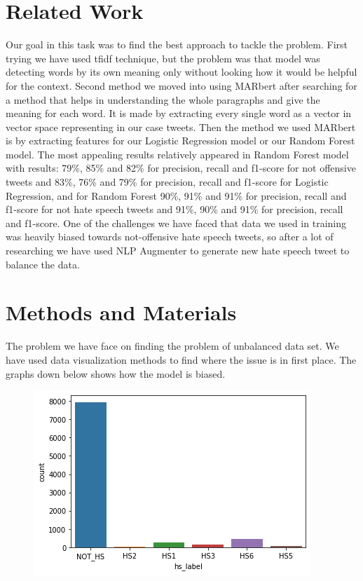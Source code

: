 \documentclass[conference]{IEEEtran}
\begin{document}
\section{Related Work}
Our goal in this task was to find the best approach to tackle the problem. First trying we have used tfidf technique, but the problem was that model was detecting words by its own meaning only without looking how it would be helpful for the context. Second method we moved into using MARbert after searching for a method that helps in understanding the whole paragraphs and give the meaning for each word. It is made by extracting every single word as a vector in vector space representing in our case tweets. Then the method we used MARbert is by extracting features for our Logistic Regression model or our Random Forest model. The most appealing results relatively appeared in Random Forest model with results: 79\%, 85\% and 82\% for precision, recall and f1-score for not offensive tweets and 83\%, 76\% and 79\% for precision, recall and f1-score for Logistic Regression, and for Random Forest 90\%, 91\% and 91\% for precision, recall and f1-score for not hate speech tweets and 91\%, 90\% and 91\% for precision, recall and f1-score. One of the challenges we have faced that data we used in training was heavily biased towards not-offensive hate speech tweets, so after a lot of researching we have used NLP Augmenter to generate new hate speech tweet to balance the data.


\section{Methods and Materials}
The problem we have face on finding the problem of unbalanced data set. We have used data visualization methods to find where the issue is in first place. The graphs down below shows how the model is biased.

\begin{figure}[htbp]
	\includegraphics[width=\columnwidth, height=0.30\paperwidth]{02.png}
\end{figure}
\end{document}
